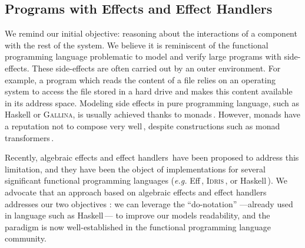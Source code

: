 
\subsection{Programs with Effects and Effect Handlers}
\label{subsec:sota:peff}

We remind our initial objective: reasoning about the interactions of a component
with the rest of the system.
%
We believe it is reminiscent of the functional programming language problematic
to model and verify large programs with side-effects.
%
These side-effects are often carried out by an outer environment. For example, a
program which reads the content of a file relies on an operating system to
access the file stored in a hard drive and makes this content available in its
address space.
%
Modeling side effects in pure programming language, such as Haskell or {\scshape
  Gallina}, is usually achieved thanks to
monads\,\cite{wadler1990comprehending,jones2005io}.  However, monads have a reputation not to compose very
well\,\cite{hyland2006combining}, despite constructions such as monad
transformers\,\cite{liang1995mtl}.

Recently, algebraic effects and effect handlers\,\cite{bauer2015effects}
 have been proposed to address this
limitation, and they have been the object of implementations for several
significant functional programming languages (\emph{e.g.}
Eff\,\cite{bauer2015effects}, {\scshape Idris}\,\cite{brady2013idris}, or
Haskell\,\cite{kiselyov2013extensible}).
%
We advocate that an approach based on algebraic effects and effect handlers
addresses our two objectives : we can
leverage the ``do-notation'' ---already used in language such as
Haskell\,\cite{haskell13}--- to improve our models readability, and the paradigm
is now well-established in the functional programming language community.

